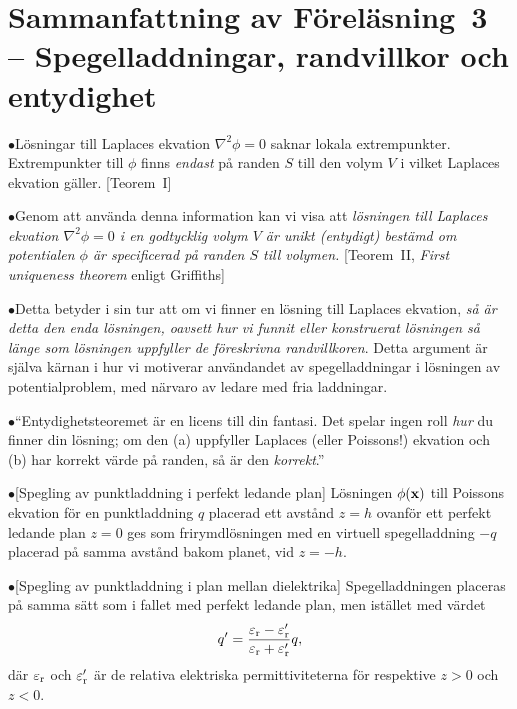 {{\section{Sammanfattning av F{\"o}rel{\"a}sning~3 -- Spegelladdningar,
  randvillkor och entydighet}
\item{$\bullet$}{L{\"o}sningar till Laplaces ekvation $\nabla^2\phi=0$
  saknar lokala extrempunkter. Extrempunkter till $\phi$ finns {\it endast}
  p{\aa} randen $S$ till den volym $V$ i vilket Laplaces ekvation g{\"a}ller.
  [Teorem~I]}
\item{$\bullet$}{Genom att anv{\"a}nda denna information kan vi visa
  att {\it l{\"o}sningen till Laplaces ekvation $\nabla^2\phi=0$ i en
  godtycklig volym $V$ {\"a}r unikt (entydigt) best{\"a}md om potentialen
  $\phi$ {\"a}r specificerad p{\aa} randen $S$ till volymen.}
  [Teorem~II, {\it First uniqueness theorem} enligt Griffiths]}
\item{$\bullet$}{Detta betyder i sin tur att om vi finner en l{\"o}sning
  till Laplaces ekvation, {\it s{\aa} {\"a}r detta den enda l{\"o}sningen,
  oavsett hur vi funnit eller konstruerat l{\"o}sningen s{\aa} l{\"a}nge
  som l{\"o}sningen uppfyller de f{\"o}reskrivna randvillkoren}.
  Detta argument {\"a}r sj{\"a}lva k{\"a}rnan i hur vi motiverar
  anv{\"a}ndandet av spegelladdningar i l{\"o}sningen av potentialproblem,
  med n{\"a}rvaro av ledare med fria laddningar.}
\item{$\bullet$}{``Entydighetsteoremet {\"a}r en licens till din fantasi.
  Det spelar ingen roll {\it hur} du finner din l{\"o}sning; om den
  (a) uppfyller Laplaces (eller Poissons!) ekvation och (b) har korrekt
  v{\"a}rde p{\aa} randen, s{\aa} {\"a}r den {\it korrekt}.''}
\item{$\bullet$}{[Spegling av punktladdning i perfekt ledande plan]
  L{\"o}sningen $\phi({\bf x})$ till Poissons ekvation f{\"o}r en punktladdning
  $q$ placerad ett avst{\aa}nd $z=h$ ovanf{\"o}r ett perfekt ledande plan $z=0$
  ges som frirymdl{\"o}sningen med en virtuell spegelladdning $-q$ placerad
  p{\aa} samma avst{\aa}nd bakom planet, vid $z=-h$.}
\item{$\bullet$}{[Spegling av punktladdning i plan mellan dielektrika]
  Spegelladdningen placeras p{\aa} samma s{\"a}tt som i fallet med perfekt
  ledande plan, men ist{\"a}llet med v{\"a}rdet
  $$
    q'={{\varepsilon_{\rm r}-\varepsilon'_{\rm r}}
         \over{\varepsilon_{\rm r}+\varepsilon'_{\rm r}}}q,
  $$
  d{\"a}r $\varepsilon_{\rm r}$ och $\varepsilon'_{\rm r}$ {\"a}r de relativa
  elektriska permittiviteterna f{\"o}r respektive $z>0$ och $z<0$.}
}}

